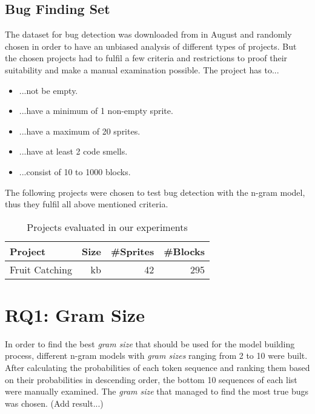 \subsection{Bug Finding Set}\label{subsec:bugset}
The dataset for bug detection was downloaded from \scratch{} in August and randomly chosen in order to have an unbiased analysis of different types of \scratch{} projects. But the chosen projects had to fulfil a few criteria and restrictions to proof their suitability and make a manual examination possible. The project has to...
\begin{itemize}
\item ...not be empty.
\item ...have a minimum of 1 non-empty sprite.
\item ...have a maximum of 20 sprites.
\item ...have at least 2 code smells.
\item ...consist of 10 to 1000 blocks.
\end{itemize}

The following projects were chosen to test bug detection with the n-gram model, thus they fulfil all above mentioned criteria. 
\begin{table}[H]
    \centering
    \caption[Projects evaluated in our experiments]{\label{tab:projects}Projects evaluated in our experiments}
    \begin{tabular}{lrrr}
        \toprule
        Project & Size & \#Sprites & \#Blocks \\
        \midrule
        Fruit Catching & kb & 42 & 295 \\
        \bottomrule
    \end{tabular}
\end{table}


\section{RQ1: Gram Size}\label{sec:gram_size}
In order to find the best \textit{gram size} that should be used for the model building process, different n-gram models with \textit{gram sizes} ranging from 2 to 10 were built. After calculating the probabilities of each token sequence and ranking them based on their probabilities in descending order, the bottom 10 sequences of each list were manually examined. The \textit{gram size} that managed to find the most true bugs was chosen. (Add result...)



